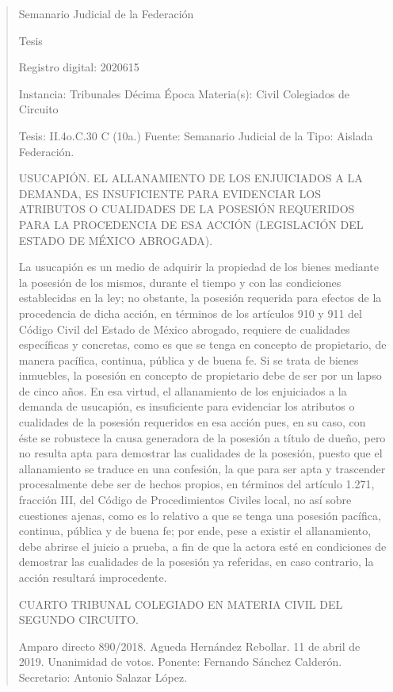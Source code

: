 \documentclass[11pt,a4paper]{article}
\begin{document}
\begin{quote}
                                                  Semanario Judicial de la Federación

                                              Tesis

 Registro digital: 2020615

 Instancia: Tribunales            Décima Época                         Materia(s): Civil
 Colegiados de Circuito

 Tesis: II.4o.C.30 C (10a.)       Fuente: Semanario Judicial de la     Tipo: Aislada
                                  Federación.


USUCAPIÓN. EL ALLANAMIENTO DE LOS ENJUICIADOS A LA DEMANDA, ES INSUFICIENTE
PARA EVIDENCIAR LOS ATRIBUTOS O CUALIDADES DE LA POSESIÓN REQUERIDOS PARA
LA PROCEDENCIA DE ESA ACCIÓN (LEGISLACIÓN DEL ESTADO DE MÉXICO ABROGADA).


La usucapión es un medio de adquirir la propiedad de los bienes mediante la posesión de los
mismos, durante el tiempo y con las condiciones establecidas en la ley; no obstante, la posesión
requerida para efectos de la procedencia de dicha acción, en términos de los artículos 910 y 911 del
Código Civil del Estado de México abrogado, requiere de cualidades específicas y concretas, como
es que se tenga en concepto de propietario, de manera pacífica, continua, pública y de buena fe. Si
se trata de bienes inmuebles, la posesión en concepto de propietario debe de ser por un lapso de
cinco años. En esa virtud, el allanamiento de los enjuiciados a la demanda de usucapión, es
insuficiente para evidenciar los atributos o cualidades de la posesión requeridos en esa acción pues,
en su caso, con éste se robustece la causa generadora de la posesión a título de dueño, pero no
resulta apta para demostrar las cualidades de la posesión, puesto que el allanamiento se traduce en
una confesión, la que para ser apta y trascender procesalmente debe ser de hechos propios, en
términos del artículo 1.271, fracción III, del Código de Procedimientos Civiles local, no así sobre
cuestiones ajenas, como es lo relativo a que se tenga una posesión pacífica, continua, pública y de
buena fe; por ende, pese a existir el allanamiento, debe abrirse el juicio a prueba, a fin de que la
actora esté en condiciones de demostrar las cualidades de la posesión ya referidas, en caso
contrario, la acción resultará improcedente.

CUARTO TRIBUNAL COLEGIADO EN MATERIA CIVIL DEL SEGUNDO CIRCUITO.


Amparo directo 890/2018. Agueda Hernández Rebollar. 11 de abril de 2019. Unanimidad de votos.
Ponente: Fernando Sánchez Calderón. Secretario: Antonio Salazar López.



\end{quote}
\end{document}

